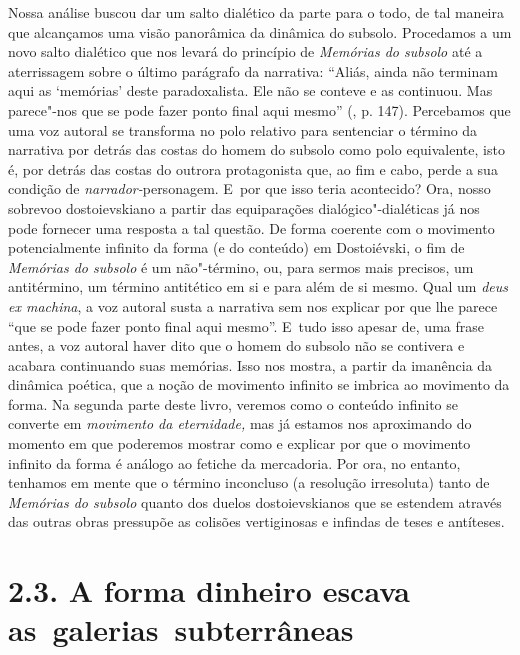 Nossa análise buscou dar um salto dialético da parte para o todo, de tal
maneira que alcançamos uma visão panorâmica da dinâmica do subsolo.
Procedamos a um novo salto dialético que nos levará do princípio de
\emph{Memórias do subsolo} até a aterrissagem sobre o último parágrafo
da narrativa: ``Aliás, ainda não terminam aqui as `memórias' deste
paradoxalista. Ele não se conteve e as continuou. Mas parece"-nos que se
pode fazer ponto final aqui mesmo'' (, p. 147). Percebamos que uma
voz autoral se transforma no polo relativo para sentenciar o término da
narrativa por detrás das costas do homem do subsolo como polo
equivalente, isto é, por detrás das costas do outrora protagonista que,
ao fim e cabo, perde a sua condição de \emph{narrador-}personagem. E~por
que isso teria acontecido? Ora, nosso sobrevoo dostoievskiano a partir
das equiparações dialógico"-dialéticas já nos pode fornecer uma resposta
a tal questão. De forma coerente com o movimento potencialmente infinito
da forma (e do conteúdo) em Dostoiévski, o fim de \emph{Memórias do
subsolo} é um não"-término, ou, para sermos mais precisos, um
antitérmino, um término antitético em si e para além de si mesmo. Qual
um \emph{deus ex machina}, a voz autoral susta a narrativa sem nos
explicar por que lhe parece ``que se pode fazer ponto final aqui
mesmo''. E~tudo isso apesar de, uma frase antes, a voz autoral haver
dito que o homem do subsolo não se contivera e acabara continuando suas
memórias. Isso nos mostra, a partir da imanência da dinâmica poética,
que a noção de movimento infinito se imbrica ao movimento da forma. Na
segunda parte deste livro, veremos como o conteúdo infinito se converte
em \emph{movimento da eternidade,} mas já estamos nos aproximando do
momento em que poderemos mostrar como e explicar por que o movimento
infinito da forma é análogo ao fetiche da mercadoria. Por ora, no
entanto, tenhamos em mente que o término inconcluso (a resolução
irresoluta) tanto de \emph{Memórias do subsolo} quanto dos duelos
dostoievskianos que se estendem através das outras obras pressupõe as
colisões vertiginosas e infindas de teses e antíteses.

\section{2.3. A forma dinheiro escava as~galerias~subterrâneas}

